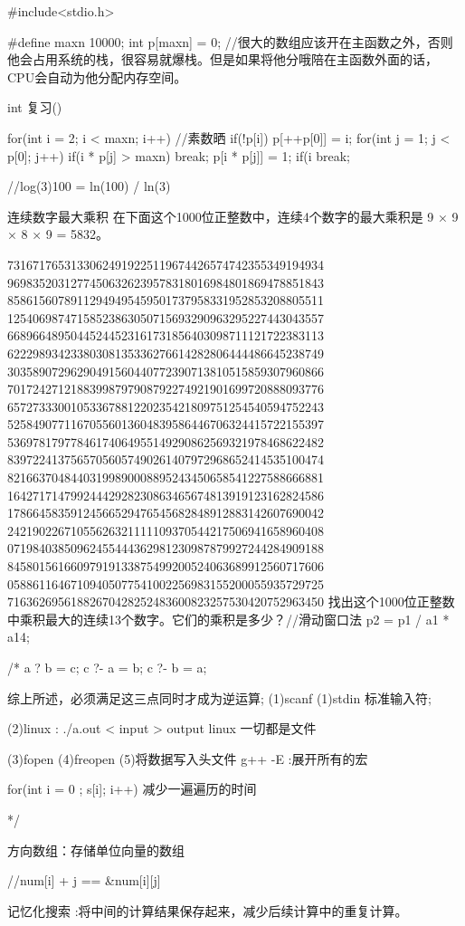 #include<stdio.h>

#define maxn 10000;
int p[maxn] = {0};  //很大的数组应该开在主函数之外，否则他会占用系统的栈，很容易就爆栈。但是如果将他分哦陪在主函数外面的话，CPU会自动为他分配内存空间。


int 复习()

{
    for(int i = 2; i < maxn; i++)  //素数晒
    {
        if(!p[i])
        p[++p[0]] = i;
        for(int j = 1; j < p[0]; j++)
        {
            if(i * p[j] > maxn)
            break;
            p[i * p[j]] = 1;
            if(i %
            break;
        }
    }
}



 //log(3)100 = ln(100) / ln(3)
 
 
 
 
 
 
 
 
 
 
连续数字最大乘积
在下面这个1000位正整数中，连续4个数字的最大乘积是 9 × 9 × 8 × 9 = 5832。


73167176531330624919225119674426574742355349194934
96983520312774506326239578318016984801869478851843
85861560789112949495459501737958331952853208805511
12540698747158523863050715693290963295227443043557
66896648950445244523161731856403098711121722383113
62229893423380308135336276614282806444486645238749
30358907296290491560440772390713810515859307960866
70172427121883998797908792274921901699720888093776
65727333001053367881220235421809751254540594752243
52584907711670556013604839586446706324415722155397
53697817977846174064955149290862569321978468622482
83972241375657056057490261407972968652414535100474
82166370484403199890008895243450658541227588666881
16427171479924442928230863465674813919123162824586
17866458359124566529476545682848912883142607690042
24219022671055626321111109370544217506941658960408
07198403850962455444362981230987879927244284909188
84580156166097919133875499200524063689912560717606
05886116467109405077541002256983155200055935729725
71636269561882670428252483600823257530420752963450
找出这个1000位正整数中乘积最大的连续13个数字。它们的乘积是多少？//滑动窗口法   p2 = p1 / a1 * a14;

/*
        a ? b = c;
        c ?- a = b;
        c ?- b = a;
        
        综上所述，必须满足这三点同时才成为逆运算;
        (1)scanf
        (1)stdin 标准输入符;
        
        (2)linux :   ./a.out < input > output
        linux 一切都是文件
        
        (3)fopen
        (4)freopen
        (5)将数据写入头文件   g++ -E :展开所有的宏
        
        for(int i = 0 ; s[i]; i++)   减少一遍遍历的时间
        
        

*/













方向数组：存储单位向量的数组

//num[i] + j   == &num[i][j]








记忆化搜索 :将中间的计算结果保存起来，减少后续计算中的重复计算。





